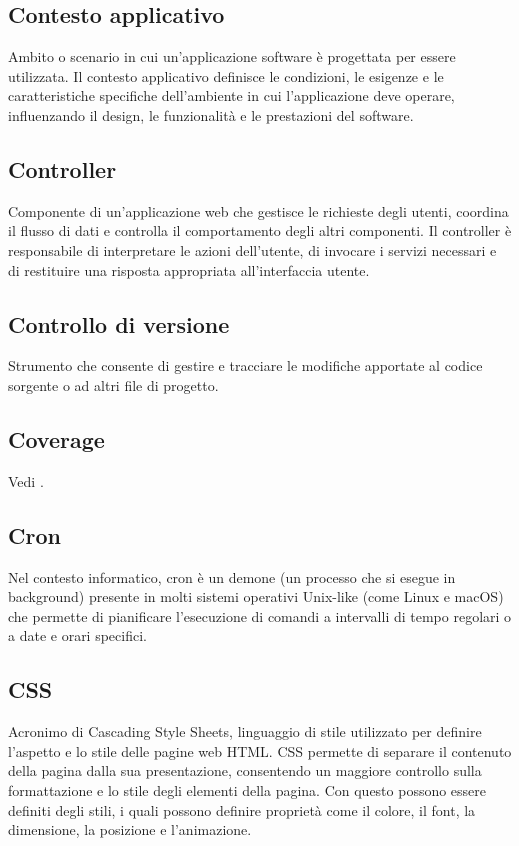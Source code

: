 \hypertarget{sec:contesto_applicativo}{}
\subsection*{Contesto applicativo}
Ambito o scenario in cui un'applicazione software è progettata per essere utilizzata. Il contesto applicativo definisce le condizioni, le esigenze e le
caratteristiche specifiche dell'ambiente in cui l'applicazione deve operare, influenzando il design, le funzionalità e le prestazioni del software.

\hypertarget{sec:controller}{}
\subsection*{Controller}
Componente di un'applicazione web che gestisce le richieste degli utenti, coordina il flusso di dati e controlla il comportamento degli altri componenti.
Il controller è responsabile di interpretare le azioni dell'utente, di invocare i servizi necessari e di restituire una risposta appropriata all'interfaccia utente.

\hypertarget{sec:controllo_versione}{}
\subsection*{Controllo di versione}
Strumento che consente di gestire e tracciare le modifiche apportate al codice sorgente o ad altri file di progetto.

\hypertarget{sec:coverage}{}
\subsection*{Coverage}
Vedi .

\hypertarget{sec:cron}{}
\subsection*{Cron}
Nel contesto informatico, cron è un demone (un processo che si esegue in background) presente in molti sistemi operativi Unix-like 
(come Linux e macOS) che permette di pianificare l'esecuzione di comandi a intervalli di tempo regolari o a date e orari specifici.

\hypertarget{sec:css}{}
\subsection*{CSS}
Acronimo di Cascading Style Sheets, linguaggio di stile utilizzato per definire l’aspetto e lo stile delle pagine web HTML. CSS 
permette di separare il contenuto della pagina dalla sua presentazione, consentendo un maggiore controllo sulla formattazione e lo 
stile degli elementi della pagina. Con questo possono essere definiti degli stili, i quali possono definire proprietà come il colore, 
il font, la dimensione, la posizione e l’animazione.

\newpage